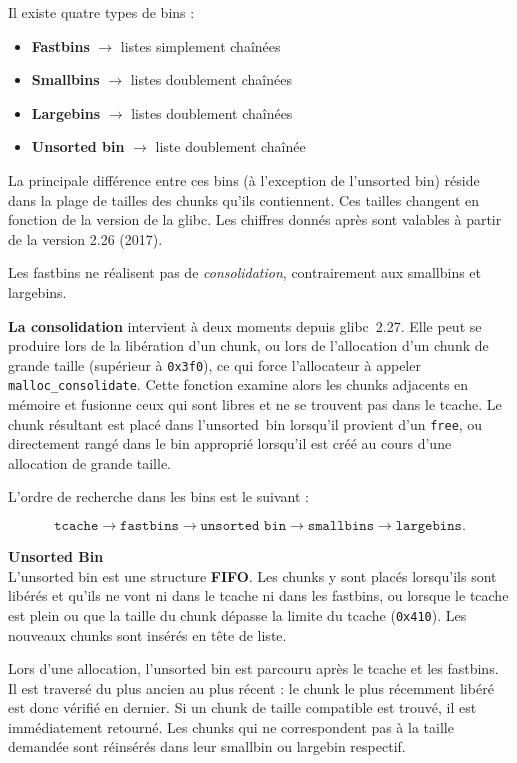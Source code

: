 Il existe quatre types de bins :
\begin{itemize}
    \item \textbf{Fastbins} $\rightarrow$ listes simplement chaînées
    \item \textbf{Smallbins} $\rightarrow$ listes doublement chaînées
    \item \textbf{Largebins} $\rightarrow$ listes doublement chaînées
    \item \textbf{Unsorted bin} $\rightarrow$ liste doublement chaînée
\end{itemize}

La principale différence entre ces bins (à l'exception de l'unsorted bin) réside dans la
plage de tailles des chunks qu'ils contiennent.
Ces tailles changent en fonction de la version de la glibc.
Les chiffres donnés après sont valables à partir de la version 2.26 (2017).

\noindent Les fastbins ne réalisent pas de \textit{consolidation}, contrairement aux smallbins et largebins.

\textbf{La consolidation} intervient à deux moments depuis glibc~2.27.
Elle peut se produire lors de la libération d’un chunk, ou lors de
l’allocation d’un chunk de grande taille (supérieur à \texttt{0x3f0}),
ce qui force l’allocateur à appeler \texttt{malloc\_consolidate}.
Cette fonction examine alors les chunks adjacents en mémoire et fusionne
ceux qui sont libres et ne se trouvent pas dans le tcache. Le chunk
résultant est placé dans l’unsorted~bin lorsqu’il provient d’un
\texttt{free}, ou directement rangé dans le bin approprié lorsqu’il est
créé au cours d’une allocation de grande taille.


L'ordre de recherche dans les bins est le suivant :


\[
    \texttt{tcache} \rightarrow \texttt{fastbins} \rightarrow \texttt{unsorted bin} \rightarrow \texttt{smallbins} \rightarrow \texttt{largebins}.
\]



\vp

\noindent\textbf{Unsorted Bin}\\
L'unsorted bin est une structure \textbf{FIFO}.
Les chunks y sont placés lorsqu'ils sont libérés et qu'ils ne vont ni dans le tcache
ni dans les fastbins, ou lorsque le tcache est plein ou que la taille du chunk dépasse
la limite du tcache (\texttt{0x410}).
Les nouveaux chunks sont insérés en tête de liste.

Lors d'une allocation, l'unsorted bin est parcouru après le tcache et les fastbins.
Il est traversé du plus ancien au plus récent : le chunk le plus récemment libéré est
donc vérifié en dernier.
Si un chunk de taille compatible est trouvé, il est immédiatement retourné.
Les chunks qui ne correspondent pas à la taille demandée sont réinsérés dans leur
smallbin ou largebin respectif.

